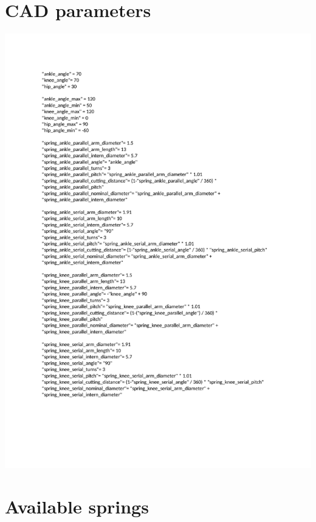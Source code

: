 \begin{appendices}
    \section{CAD parameters}
    \label{app:cad_parameters}
        \includegraphics[width=195mm]{chapters/cha_appendices/cad_parameters}

    \section{Available springs} %
    \label{sec:available_springs_}
    

\end{appendices}
